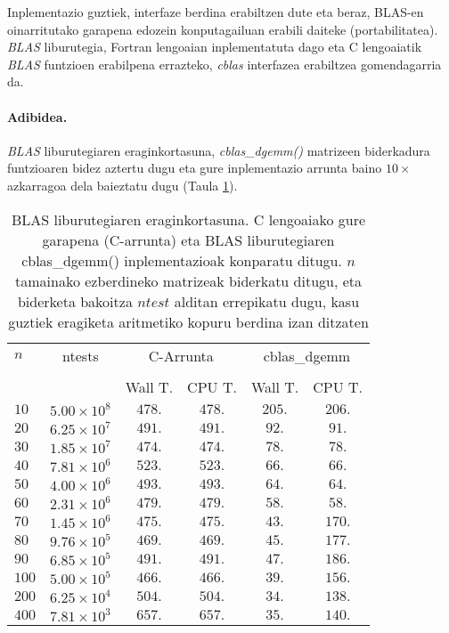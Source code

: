 Inplementazio guztiek, interfaze berdina erabiltzen dute eta beraz, BLAS-en oinarritutako garapena edozein konputagailuan erabili daiteke (portabilitatea). \emph{BLAS} liburutegia, Fortran lengoaian inplementatuta dago eta C lengoaiatik \emph{BLAS} funtzioen erabilpena errazteko, \emph{cblas} interfazea erabiltzea gomendagarria da. 

\paragraph{Adibidea.}\emph{BLAS} liburutegiaren eraginkortasuna, \emph{cblas\_dgemm()} matrizeen biderkadura funtzioaren  bidez aztertu dugu eta gure inplementazio arrunta baino $10\times$ azkarragoa dela baieztatu dugu (Taula \ref{tab:blas}). 

\begin{table}[h]
\caption[BLAS liburutegiaren eraginkortasuna.] 
{\small{BLAS liburutegiaren eraginkortasuna. C lengoaiako gure garapena (C-arrunta) eta BLAS liburutegiaren cblas\_dgemm() inplementazioak konparatu ditugu. $n$ tamainako ezberdineko matrizeak biderkatu ditugu, eta biderketa bakoitza $ntest$ alditan errepikatu dugu, kasu guztiek eragiketa aritmetiko kopuru berdina izan ditzaten}}
\label{tab:blas}      
\centering
{%
\begin{tabular}{l c c c c c } 
 \hline
  $n$     & ntests        &  \multicolumn{2}{c}{C-Arrunta}  & \multicolumn{2}{c}{cblas\_dgemm} \\
 \\
          &                   & Wall T. & CPU T. &  Wall T. & CPU T. \\
 \hline         
 $10$  &   $5.00\times10^8$   & $478.$   & $478.$  & $205.$  & $206.$   \\ 
 $20$  &   $6.25\times10^7$   & $491.$   &  $491.$  & $92.$   & $91.$   \\ 
 $30$  &   $1.85\times10^7$   & $474.$    & $474.$ & $78.$   & $78.$   \\ 
 $40$  &   $7.81\times10^6$   & $523.$    & $523.$ & $66.$   & $66.$   \\ 
 $50$  &   $4.00\times10^6$   & $493.$    & $493.$ & $64.$   & $64.$   \\ 
 $60$  &   $2.31\times10^6$   & $479.$    & $479.$ & $58.$   & $58.$   \\ 
 $70$  &   $1.45\times10^6$   & $475.$    & $475.$ & $43.$   & $170.$   \\ 
 $80$  &   $9.76\times10^5$   & $469.$    & $469.$ & $45.$   & $177.$   \\ 
 $90$  &   $6.85\times10^5$   & $491.$    & $491.$ & $47.$   & $186.$   \\ 
 $100$ &   $5.00\times10^5$   & $466.$    & $466.$ & $39.$   & $156.$   \\ 
 $200$ &   $6.25\times10^4$   & $504.$    & $504.$ & $34.$   & $138.$   \\ 
 $400$ &   $7.81\times10^3$   & $657.$    & $657.$ & $35.$   & $140.$   \\ 
   \hline
 \end{tabular}}
\end{table}   

